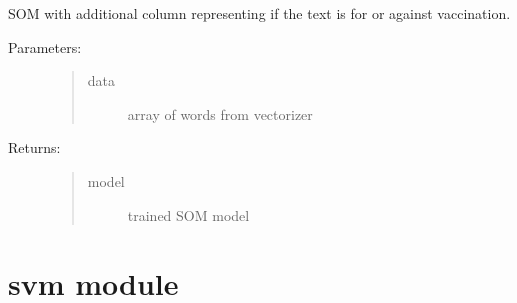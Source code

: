 \documentclass[letterpaper,10pt,english]{sphinxmanual}
\begin{document}
\begin{fulllineitems}
\label{\detokenize{som:som.somWithClassInfo}}
\pysigstartsignatures
{}
\pysigstopsignatures
\sphinxAtStartPar
SOM with additional column representing if the text is for or against vaccination.
\begin{description}
\item[{Parameters:}] \leavevmode\begin{quote}\begin{description}
\item[{data}] \leavevmode
\sphinxAtStartPar
array of words from vectorizer

\end{description}\end{quote}

\item[{Returns:}] \leavevmode\begin{quote}\begin{description}
\item[{model}] \leavevmode
\sphinxAtStartPar
trained SOM model

\end{description}\end{quote}

\end{description}

\end{fulllineitems}


\sphinxstepscope


\section{svm module}
\label{\detokenize{svm:module-svm}}\label{\detokenize{svm:svm-module}}\label{\detokenize{svm::doc}}
\end{document}
